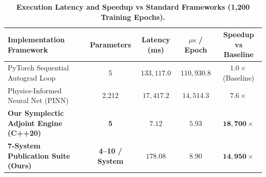 \documentclass{article}
\begin{document}
\begin{table}[h]
\centering
\small
\caption{\textbf{Execution Latency and Speedup vs Standard Frameworks (1,200 Training Epochs).}}
\label{tab:latency_speedup}
\begin{tabular}{lcccc}
\toprule
\textbf{Implementation Framework} & \textbf{Parameters} & \textbf{Latency (ms)} & \textbf{$\mu\text{s}$ / Epoch} & \textbf{Speedup vs Baseline} \\
\midrule
PyTorch Sequential Autograd Loop & 5 & $133,117.0$ & $110,930.8$ & $1.0\times$ (Baseline) \\
Physics-Informed Neural Net (PINN) & 2,212 & $17,417.2$ & $14,514.3$ & $7.6\times$ \\
\textbf{Our Symplectic Adjoint Engine (C++20)} & \textbf{5} & $\mathbf{7.12}$ & $\mathbf{5.93}$ & $\mathbf{18,700\times}$ \\
\textbf{7-System Publication Suite (Ours)} & \textbf{4--10 / System} & $\mathbf{178.08}$ & $\mathbf{8.90}$ & $\mathbf{14,950\times}$ \\
\bottomrule
\end{tabular}
\end{table}
\end{document}
